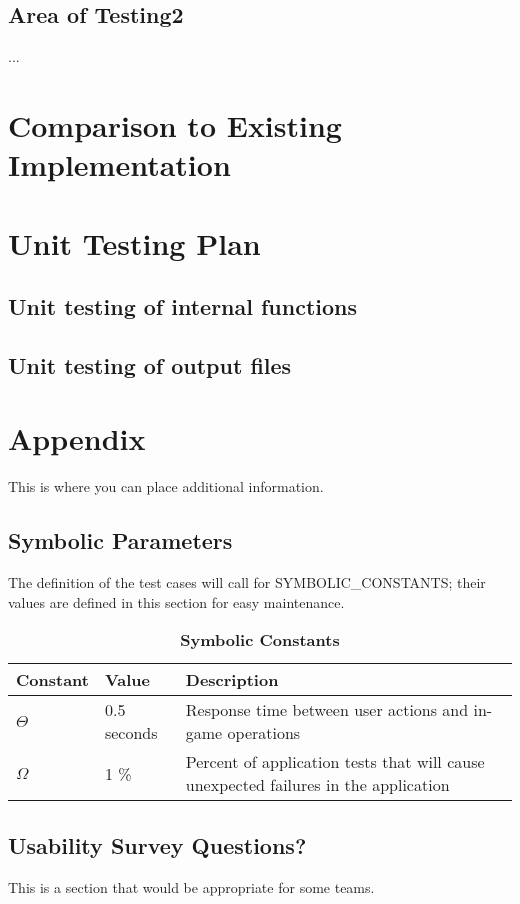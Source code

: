 \documentclass[12pt, titlepage]{article}
\begin{document}
\subsection{Area of Testing2}

...

	
\section{Comparison to Existing Implementation}	
				
\section{Unit Testing Plan}
		
\subsection{Unit testing of internal functions}
		
\subsection{Unit testing of output files}		

%

%

\newpage

\section{Appendix}

This is where you can place additional information.

\subsection{Symbolic Parameters}

The definition of the test cases will call for SYMBOLIC\_CONSTANTS; their values are defined in this section for easy maintenance.

\begin{table}[H]
\caption{\bf Symbolic Constants} \label{tab:constants}
\begin{tabularx}{\textwidth}{p{3cm}p{2cm}X}
\toprule {\bf Constant} & {\bf Value} & {\bf Description}\\
\midrule
$\Theta$ & 0.5 seconds & Response time between user actions and in-game operations\\
$\Omega$ & 1 \% & Percent of application tests that will cause unexpected failures in the application\\
\bottomrule
\end{tabularx}
\end{table}

\subsection{Usability Survey Questions?}

This is a section that would be appropriate for some teams.
\end{document}
